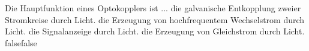     {Die Hauptfunktion eines Optokopplers ist ...}
    {die galvanische Entkopplung zweier Stromkreise durch Licht.}
    {die Erzeugung von hochfrequentem Wechselstrom durch Licht.}
    {die Signalanzeige durch Licht.}
    {die Erzeugung von Gleichstrom durch Licht.}
    {false}{false}